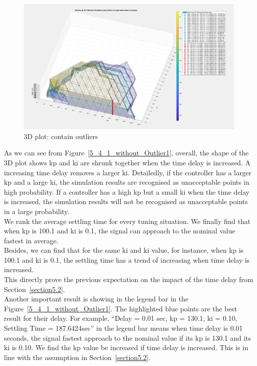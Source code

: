 \begin{figure}[htbp]
\centering
\includegraphics[width = .819\textwidth]{figure/5_4_1_without_Outlier2.png}
\caption{3D plot: contain outliers}
\label{5_4_1_without_Outlier2}
\end{figure}


As we can see from Figure~\ref{5_4_1_without_Outlier1}, overall, the shape of the 3D plot shows kp and ki are shrunk together when the time delay is increased. A increasing time delay removes a larger ki. Detailedly, if the controller has a larger kp and a large ki, the simulation results are recognised as unacceptable points in high probability. If a controller has a high kp but a small ki when the time delay is increased, the simulation results will not be recognised as unacceptable points in a large probability.\\

We rank the average settling time for every tuning situation. We finally find that when kp is 100.1 and ki is 0.1, the signal can approach to the nominal value fastest in average.\\

Besides, we can find that for the same ki and ki value, for instance, when kp is 100.1 and ki is 0.1, the settling time has a trend of increasing when time delay is increased. \\

This directly prove the previous expectation on the impact of the time delay from Section~\ref{section5.2}. \\


Another important result is showing in the legend bar in the Figure~\ref{5_4_1_without_Outlier1}. The highlighted blue points are the best result for their delay. For example, “Delay = 0.01 sec, kp = 130.1, ki = 0.10, Settling Time = 187.6424sec” in the legend bar means when time delay is 0.01 seconds, the signal fastest approach to the nominal value if its kp is 130.1 and its ki is 0.10. We find the kp value be increased if time delay is increased. This is in line with the assumption in Section~\ref{section5.2}.\\

